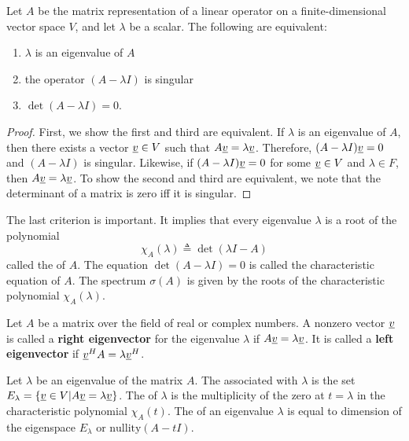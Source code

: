 \begin{theorem}
Let $A$ be the matrix representation of a linear operator on a finite-dimensional vector space $V$, and let $\lambda$ be a scalar.
The following are equivalent:
\begin{enumerate}
\item $\lambda$ is an eigenvalue of $A$
\item the operator $(A - \lambda I)$ is singular
\item $\det (A - \lambda I) = 0$.
\end{enumerate}
\end{theorem}
\begin{proof}
First, we show the first and third are equivalent.
If $\lambda$ is an eigenvalue of $A$, then there exists a vector $\underline{v} \in V$ such that $A \underline{v} = \lambda \underline{v}$.
Therefore, $(A-\lambda I)\underline{v} = 0$ and $(A - \lambda I)$ is singular.
Likewise, if $(A-\lambda I)\underline{v} = 0$ for some $\underline{v} \in V$ and $\lambda \in F$, then $A \underline{v} = \lambda \underline{v}$.
To show the second and third are equivalent, we note that the determinant of a matrix is zero iff it is singular.
\end{proof}

The last criterion is important.
It implies that every eigenvalue $\lambda$ is a root of the polynomial 
\[ \chi_A (\lambda) \triangleq \det (\lambda I - A) \]
called the  of $A$.
The equation $\det (A - \lambda I) = 0$ is called the characteristic equation of $A$.
The spectrum $\sigma(A)$ is given by the roots of the characteristic polynomial $\chi_A (\lambda)$.

Let $A$ be a matrix over the field of real or complex numbers.
A nonzero vector $\underline{v}$ is called a \textbf{right eigenvector} for the eigenvalue $\lambda$ if $A \underline{v} = \lambda \underline{v}$.
It is called a \textbf{left eigenvector} if $\underline{v}^H A = \lambda \underline{v}^H$.

\begin{definition}
Let $\lambda$ be an eigenvalue of the matrix $A$.
The  associated with $\lambda$ is the set $E_\lambda = \{ \underline{v} \in V | A \underline{v} = \lambda \underline{v} \}$.
The  of $\lambda$ is the multiplicity of the zero at $t=\lambda$ in the characteristic polynomial $\chi_A (t)$.
The  of an eigenvalue $\lambda$ is equal to dimension of the eigenspace $E_\lambda$ or $\textrm{nullity}(A - t I)$.
\end{definition}

